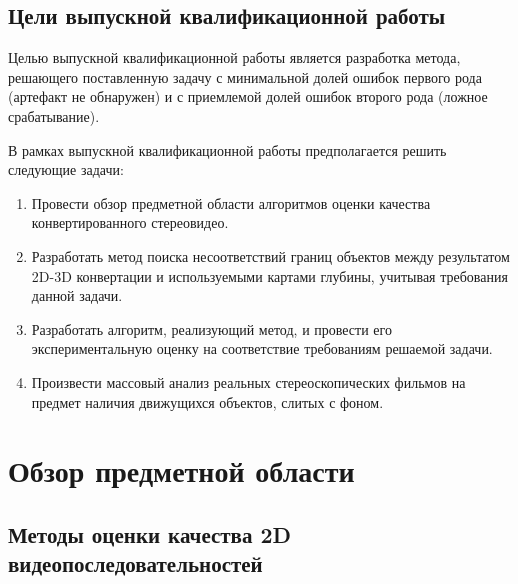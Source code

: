 \documentclass[14pt, a4paper]{extarticle}
\begin{document}
\subsection{Цели выпускной квалификационной работы}

Целью выпускной квалификационной работы является разработка метода, решающего поставленную задачу 
с минимальной долей ошибок первого рода (артефакт не обнаружен) и 
с приемлемой долей ошибок второго рода (ложное срабатывание).

В рамках выпускной квалификационной работы предполагается решить следующие задачи:

\begin{enumerate}
	\item Провести обзор предметной области алгоритмов оценки качества конвертированного стереовидео.
	\item Разработать метод поиска несоответствий границ объектов между результатом 2D-3D конвертации 
	и используемыми картами глубины, учитывая требования данной задачи.
	\item Разработать алгоритм, реализующий метод, и провести его экспериментальную оценку 
	на соответствие требованиям решаемой задачи.
	\item Произвести массовый анализ реальных стереоскопических фильмов 
	на предмет наличия движущихся объектов, слитых с фоном.
\end{enumerate}


\newpage
\section{Обзор предметной области}

\subsection{Методы оценки качества 2D видеопоследовательностей}
\end{document}
